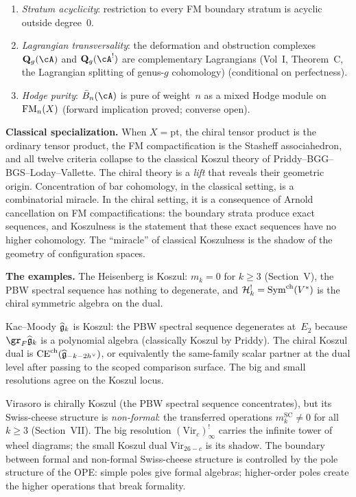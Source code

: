 \begin{enumerate}[label=\textup{(\roman*)},leftmargin=2em,itemsep=2pt]
 bar-relevant range; no singular vectors intrude to create unexpected
 cohomology classes.
\item \emph{Stratum acyclicity}: restriction to every FM boundary
 stratum is acyclic outside degree~$0$.
\item \emph{Lagrangian transversality}: the deformation and
 obstruction complexes $\mathbf{Q}_g(\cA)$ and $\mathbf{Q}_g(\cA^!)$
 are complementary Lagrangians
 (Vol~I, Theorem~C, the Lagrangian splitting of genus-$g$ cohomology) (conditional on perfectness).
\item \emph{Hodge purity}: $\barB_n(\cA)$ is pure of weight~$n$
 as a mixed Hodge module on $\operatorname{FM}_n(X)$ (forward implication proved; converse open).
\end{enumerate}

\medskip\noindent\textbf{Classical specialization.}\enspace
When $X = \mathrm{pt}$, the chiral tensor product is the ordinary
tensor product, the FM compactification is the Stasheff
associahedron, and all twelve criteria collapse to the classical
Koszul theory of Priddy--BGG--BGS--Loday--Vallette. The chiral theory
is a \emph{lift} that reveals their geometric origin. Concentration of
bar cohomology, in the classical setting, is a combinatorial miracle.
In the chiral setting, it is a consequence of Arnold cancellation on
FM compactifications: the boundary strata produce exact sequences,
and Koszulness is the statement that these exact sequences have no
higher cohomology. The ``miracle'' of classical Koszulness is the
shadow of the geometry of configuration spaces.

\medskip\noindent\textbf{The examples.}\enspace
The Heisenberg is Koszul: $m_k = 0$ for $k \geq 3$
(Section~V), the PBW spectral sequence has nothing to degenerate, and
$\mathcal{H}_k^! = \mathrm{Sym}^{\mathrm{ch}}(V^*)$ is the chiral symmetric algebra on the dual.

Kac--Moody $\widehat{\mathfrak{g}}_k$ is Koszul: the PBW spectral sequence
degenerates at~$E_2$ because $\gr_F \widehat{\fg}_k$ is a polynomial
algebra (classically Koszul by Priddy). The chiral Koszul dual is
$\mathrm{CE}^{\mathrm{ch}}(\widehat{\mathfrak{g}}_{-k-2h^\vee})$, or
equivalently the same-family scalar partner at the dual level after
passing to the scoped comparison surface. The big and small
resolutions agree on the Koszul locus.

Virasoro is chirally Koszul (the PBW spectral sequence concentrates),
but its Swiss-cheese structure is \emph{non-formal}: the transferred
operations $m_k^{\mathrm{SC}} \neq 0$ for all $k \geq 3$
(Section~VII). The big resolution $(\mathrm{Vir}_c)^!_\infty$
carries the infinite tower of wheel diagrams; the small Koszul dual
$\mathrm{Vir}_{26-c}$ is its shadow. The boundary between formal
and non-formal Swiss-cheese structure is controlled by the pole
structure of the OPE: simple poles give formal algebras;
higher-order poles create the higher operations that break formality.

